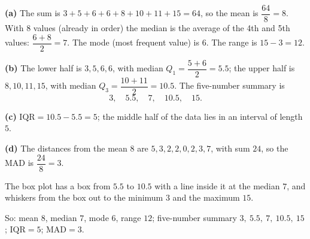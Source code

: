 \textbf{(a)} The sum is $3+5+6+6+8+10+11+15=64$, so the mean is $\dfrac{64}{8}=8$. With $8$ values (already in order) the median is the average of the 4th and 5th values: $\dfrac{6+8}{2}=7$. The mode (most frequent value) is $6$. The range is $15-3=12$.

\textbf{(b)} The lower half is $3,5,6,6$, with median $Q_1=\dfrac{5+6}{2}=5.5$; the upper half is $8,10,11,15$, with median $Q_3=\dfrac{10+11}{2}=10.5$. The five-number summary is
\[
3,\quad 5.5,\quad 7,\quad 10.5,\quad 15 .
\]

\textbf{(c)} $\text{IQR}=10.5-5.5=5$; the middle half of the data lies in an interval of length $5$.

\textbf{(d)} The distances from the mean $8$ are $5,3,2,2,0,2,3,7$, with sum $24$, so the MAD is $\dfrac{24}{8}=3$.

The box plot has a box from $5.5$ to $10.5$ with a line inside it at the median $7$, and whiskers from the box out to the minimum $3$ and the maximum $15$.

So: mean $8$, median $7$, mode $6$, range $12$; five-number summary $3,\ 5.5,\ 7,\ 10.5,\ 15$; $\text{IQR}=5$; $\text{MAD}=3$.
